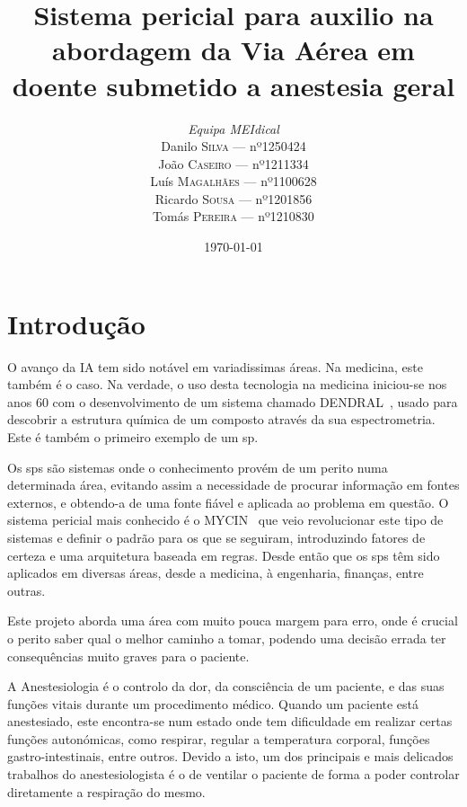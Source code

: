 \documentclass[a4paper,12pt,twoside]{article}
\institute{Insituto Politécnico do Porto}
\title{Sistema pericial para auxilio na abordagem da Via Aérea em doente submetido a anestesia geral}
\author{
    \textit{Equipa MEIdical}\\
    Danilo \textsc{Silva}  --- nº1250424\\
    João \textsc{Caseiro} --- nº1211334\\
    Luís \textsc{Magalhães} --- nº1100628\\
    Ricardo \textsc{Sousa} --- nº1201856\\
    Tomás \textsc{Pereira} --- nº1210830\\
}
\date{\today}
\begin{document}
    \maketitle
    \tableofcontents
    \vspace{2em}
    \listoffigures

    \newpage
    \clearpage
    \pagestyle{fancy}
    \fancyhf{}



    \fancyfoot[RE,RO]{\thepage}
    
    \section{Introdução}

    O avanço da \gls{IA} tem sido notável em variadissimas áreas. Na medicina, este também é o caso. Na verdade, o uso desta tecnologia na medicina iniciou-se nos anos 60 com o desenvolvimento de um sistema chamado \gls{DENDRAL}~\cite{feigenbaum}, usado para descobrir a estrutura química de um composto através da sua espectrometria. Este é também o primeiro exemplo de um \gls{sp}. 
    
    Os \glspl{sp} são sistemas onde o conhecimento provém de um perito numa determinada área, evitando assim a necessidade de procurar informação em fontes externos, e obtendo-a de uma fonte fiável e aplicada ao problema em questão. O sistema pericial mais conhecido é o \gls{MYCIN}~\cite{shortliffe} que veio revolucionar este tipo de sistemas e definir o padrão para os que se seguiram, introduzindo fatores de certeza e uma arquitetura baseada em regras. Desde então que os \glspl{sp} têm sido aplicados em diversas áreas, desde a medicina, à engenharia, finanças, entre outras.

    Este projeto aborda uma área com muito pouca margem para erro, onde é crucial o perito saber qual o melhor caminho a tomar, podendo uma decisão errada ter consequências muito graves para o paciente. 

    A Anestesiologia é o controlo da dor, da consciência de um paciente, e das suas funções vitais durante um procedimento médico. Quando um paciente está anestesiado, este encontra-se num estado onde tem dificuldade em realizar certas funções autonómicas, como respirar, regular a temperatura corporal, funções gastro-intestinais, entre outros. Devido a isto, um dos principais e mais delicados trabalhos do anestesiologista é o de ventilar o paciente de forma a poder controlar diretamente a respiração do mesmo.
\end{document}
